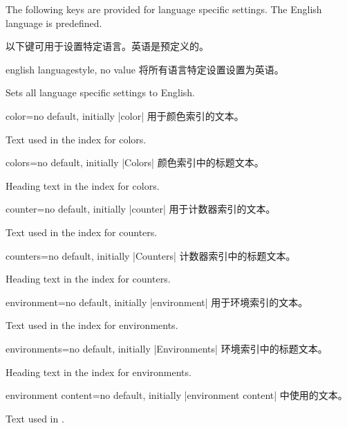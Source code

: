 The following keys are provided for language specific settings.
The English language is predefined.

以下键可用于设置特定语言。英语是预定义的。
\begin{docTcbKey}{english language}{}{style, no value}
将所有语言特定设置设置为英语。

Sets all language specific settings to English.
\end{docTcbKey}

\begin{langTcbKey}{color}{=}{no default, initially |color|}
用于颜色索引的文本。

Text used in the index for colors.
\end{langTcbKey}

\begin{langTcbKey}{colors}{=}{no default, initially |Colors|}
颜色索引中的标题文本。

Heading text in the index for colors.
\end{langTcbKey}

\begin{langTcbKey}[][doc new={2015-01-08}]{counter}{=}{no default, initially |counter|}
用于计数器索引的文本。

Text used in the index for counters.
\end{langTcbKey}

\begin{langTcbKey}[][doc new={2015-01-08}]{counters}{=}{no default, initially |Counters|}
计数器索引中的标题文本。

Heading text in the index for counters.
\end{langTcbKey}

\begin{langTcbKey}{environment}{=}{no default, initially |environment|}
用于环境索引的文本。

Text used in the index for environments.
\end{langTcbKey}

\begin{langTcbKey}{environments}{=}{no default, initially |Environments|}
环境索引中的标题文本。

Heading text in the index for environments.
\end{langTcbKey}

\begin{langTcbKey}{environment content}{=}{no default, initially |environment content|}
 中使用的文本。

Text used in .
\end{langTcbKey}

